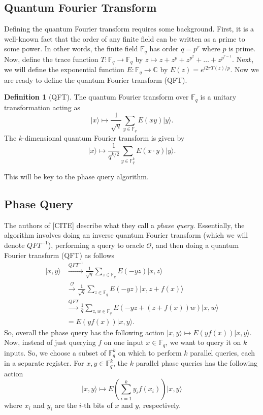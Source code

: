 \documentclass[12pt,twoside]{reedthesis}
\theoremstyle{definition}
\newtheorem{definition}[theorem]{Definition}
\newcommand{\C}{\mathbb{C}}
\newcommand{\F}{\mathbb{F}}
\newcommand{\ket}[1]{\ensuremath{\lvert #1\rangle}\xspace}
\begin{document}
\subsection{Quantum Fourier Transform}
Defining the quantum Fourier transform requires some background. First, it is a well-known fact that the order of any finite field can be written as a prime to some power. In other words, the finite field $\F_q$ has order $q = p^r$ where $p$ is prime. Now, define the trace function $T: \F_q \rightarrow \F_q$ by $z \mapsto z + z^p + z^{p^2} + \ldots + z^{p^{r-1}}$. Next, we will define the exponential function $E: \F_q \rightarrow \C$ by $E(z) = e^{i2\pi T(z)/p}$. Now we are ready to define the quantum Fourier transform (QFT).

\begin{definition}[QFT] The quantum Fourier transform over $\F_q$ is a unitary transformation acting as 
\begin{equation*}
\ket{x} \longmapsto \frac{1}{\sqrt{q}} \sum_{y \in \F_q} E(xy) \ket{y}.
\end{equation*}
The $k$-dimensional quantum Fourier transform is given by
\begin{equation*}
\ket{x} \longmapsto \frac{1}{q^{k/2}} \sum_{y\in \F_q^k} E(x \cdot y) \ket{y}.
\end{equation*}
\end{definition}
This will be key to the phase query algorithm.
\subsection{Phase Query}
The authors of [CITE] describe what they call a \textit{phase query}. Essentially, the algorithm involves doing an inverse quantum Fourier transform (which we will denote $QFT^{-1}$), performing a query to oracle $\mathcal{O}$, and then doing a quantum Fourier transform (QFT) as follows
\begin{align}
\ket{x,y} 
& \xrightarrow{QFT^{-1}} \frac{1}{\sqrt{q}} \sum_{z\in \F_q} E(-yz) \ket{x,z} \\
& \xrightarrow{\mathcal{O}} \frac{1}{\sqrt{q}} \sum_{z \in \F_q} E(-yz) \ket{x, z + f(x)} \\
& \xrightarrow{QFT} \frac{1}{q} \sum_{z,w \in \F_q} E(-yz + (z + f(x))w) \ket{x,w} \\
& = E(yf(x)) \ket{x,y}.
\end{align}
So, overall the phase query has the following action $\ket{x,y} \mapsto E(yf(x)) \ket{x,y}$. Now, instead of just querying $f$ on one input $x \in \F_q$, we want to query it on $k$ inputs. So, we choose a subset of $\F_q^k$ on which to perform $k$ parallel queries, each in a separate register. For $x,y \in \F_q^k$, the $k$ parallel phase queries has the following action
\begin{equation*}
\ket{x,y} \longmapsto E\left(\sum_{i=1}^{k} y_i f(x_i) \right) \ket{x,y}
\end{equation*}
where $x_i$ and $y_i$ are the $i$-th bits of $x$ and $y$, respectively.
\end{document}
